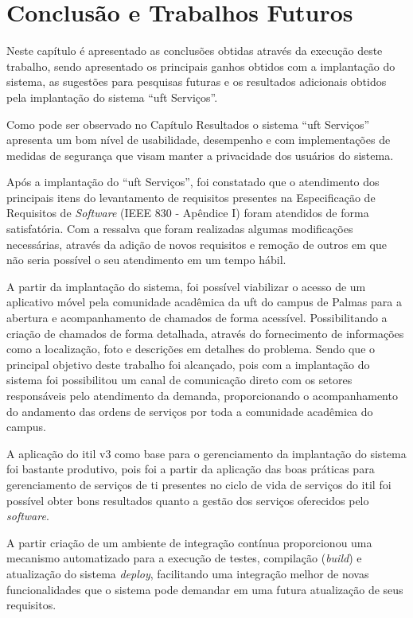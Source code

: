 \chapter{Conclusão e Trabalhos Futuros}

\noindent Neste capítulo é apresentado as conclusões obtidas através da execução deste trabalho, sendo apresentado os principais ganhos obtidos com a implantação do sistema, as sugestões para pesquisas futuras e os resultados adicionais obtidos pela implantação do sistema ``\acrshort{uft} Serviços''.

Como pode ser observado no Capítulo Resultados o sistema ``\acrshort{uft} Serviços'' apresenta um bom nível de usabilidade, desempenho e com implementações de medidas de segurança que visam manter a privacidade dos usuários do sistema.

Após a implantação do ``\acrshort{uft} Serviços'', foi constatado que o atendimento dos principais itens do levantamento de requisitos presentes na Especificação de Requisitos de \textit{Software} (IEEE 830 - Apêndice I) foram atendidos de forma satisfatória. Com a ressalva que foram realizadas algumas modificações necessárias, através da adição de novos requisitos e remoção de outros em que não seria possível o seu atendimento em um tempo hábil.

A partir da implantação do sistema, foi possível viabilizar o acesso de um aplicativo móvel pela comunidade acadêmica da \acrshort{uft} do campus de Palmas para a abertura e acompanhamento de chamados de forma acessível. Possibilitando a criação de chamados de forma detalhada, através do fornecimento de informações como a localização, foto e descrições em detalhes do problema. Sendo que o principal objetivo deste trabalho foi alcançado, pois com a implantação do sistema foi possibilitou um canal de comunicação direto com os setores responsáveis pelo atendimento da demanda, proporcionando o acompanhamento do andamento das ordens de serviços por toda a comunidade acadêmica do campus.

A aplicação do \acrshort{itil} v3 como base para o gerenciamento da implantação do sistema foi bastante produtivo, pois foi a partir da aplicação das boas práticas para gerenciamento de serviços de \acrshort{ti} presentes no ciclo de vida de serviços do \acrshort{itil} foi possível obter bons resultados quanto a gestão dos serviços oferecidos pelo \textit{software}.

A partir criação de um ambiente de integração contínua proporcionou uma mecanismo automatizado para a execução de testes, compilação (\textit{build}) e atualização do sistema \textit{deploy}, facilitando uma integração melhor de novas funcionalidades que o sistema pode demandar em uma futura atualização de seus requisitos.

